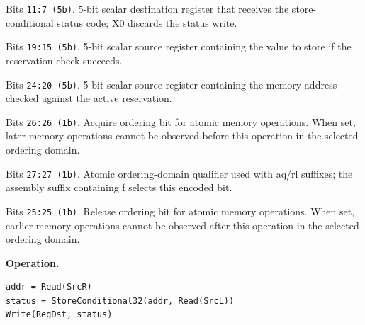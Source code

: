 \begin{description}[leftmargin=0.18\linewidth,style=nextline]
\item[\texttt{RegDst}] Bits \texttt{11:7 (5b)}. 5-bit scalar destination register that receives the store-conditional status code; X0 discards the status write.
\item[\texttt{SrcL}] Bits \texttt{19:15 (5b)}. 5-bit scalar source register containing the value to store if the reservation check succeeds.
\item[\texttt{SrcR}] Bits \texttt{24:20 (5b)}. 5-bit scalar source register containing the memory address checked against the active reservation.
\item[\texttt{aq}] Bits \texttt{26:26 (1b)}. Acquire ordering bit for atomic memory operations. When set, later memory operations cannot be observed before this operation in the selected ordering domain.
\item[\texttt{far}] Bits \texttt{27:27 (1b)}. Atomic ordering-domain qualifier used with aq/rl suffixes; the assembly suffix containing f selects this encoded bit.
\item[\texttt{rl}] Bits \texttt{25:25 (1b)}. Release ordering bit for atomic memory operations. When set, earlier memory operations cannot be observed after this operation in the selected ordering domain.
\end{description}
\noindent\textbf{Operation.}\par
\begin{lstlisting}[style=ptoscalarcode]
addr = Read(SrcR)
status = StoreConditional32(addr, Read(SrcL))
Write(RegDst, status)
\end{lstlisting}
\Needspace{0.08\textheight}
